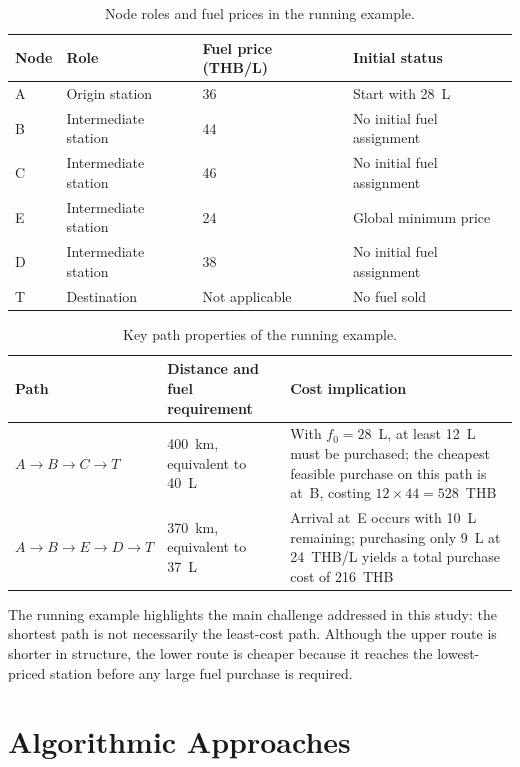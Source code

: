 \begin{table}[ht]
\centering
\caption{Node roles and fuel prices in the running example.}
\label{tab:example_nodes}
\small
\begin{tabular}{@{}llll@{}}
\toprule
Node & Role & Fuel price (THB/L) & Initial status \\
\midrule
A & Origin station & 36 & Start with 28~L \\
B & Intermediate station & 44 & No initial fuel assignment \\
C & Intermediate station & 46 & No initial fuel assignment \\
E & Intermediate station & 24 & Global minimum price \\
D & Intermediate station & 38 & No initial fuel assignment \\
T & Destination & Not applicable & No fuel sold \\
\bottomrule
\end{tabular}
\end{table}

\begin{table}[ht]
\centering
\caption{Key path properties of the running example.}
\label{tab:example_paths}
\small
\begin{tabular}{@{}p{3.1cm}p{4.7cm}p{5.2cm}@{}}
\toprule
Path & Distance and fuel requirement & Cost implication \\
\midrule
$A\to B\to C\to T$ & 400~km, equivalent to 40~L & With $f_0=28$~L, at least 12~L must be purchased; the cheapest feasible purchase on this path is at~B, costing $12\times44=528$~THB \\
$A\to B\to E\to D\to T$ & 370~km, equivalent to 37~L & Arrival at~E occurs with 10~L remaining; purchasing only 9~L at 24~THB/L yields a total purchase cost of 216~THB \\
\bottomrule
\end{tabular}
\end{table}

The running example highlights the main challenge addressed in this study: the shortest path is not necessarily the least-cost path. Although the upper route is shorter in structure, the lower route is cheaper because it reaches the lowest-priced station before any large fuel purchase is required.

\section{Algorithmic Approaches}
\label{sec:algorithms}

